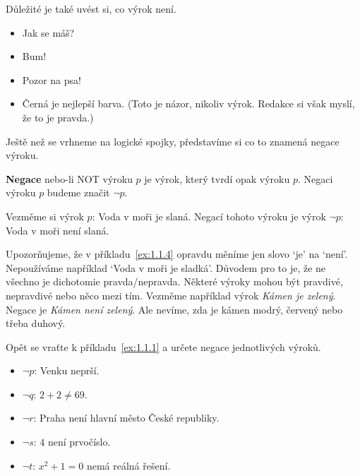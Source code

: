\pagebreak
\begin{example}
  Důležité je také uvést si, co výrok není. 
  \begin{itemize}
    \item Jak se máš?
    \item Bum!
    \item Pozor na psa!
    \item Černá je nejlepší barva. (Toto je názor, nikoliv výrok. Redakce si však myslí, že to je pravda.)
  \end{itemize}
\end{example}

Ještě než se vrhneme na logické spojky, představíme si co to znamená negace výroku.

\begin{definitionbox}
  \textbf{Negace} nebo-li NOT výroku $p$ je výrok, který tvrdí opak výroku $p$. Negaci výroku $p$ budeme značit $\neg p$.
\end{definitionbox}

\begin{example}
  Vezměme si výrok $p$: Voda v moři je slaná. Negací tohoto výroku je výrok $\neg p$: Voda v moři není slaná. 
\end{example}

\begin{definitionbox}
  Upozorňujeme, že v příkladu~\ref{ex:1.1.4} opravdu měníme jen slovo `je' na `není'. Nepoužíváme například `Voda v moři je sladká'. Důvodem pro to je, že ne všechno je dichotomie pravda/nepravda. Některé výroky mohou být pravdivé, nepravdivé nebo něco mezi tím. Vezměme například výrok \textit{Kámen je zelený}. Negace je \textit{Kámen není zelený}. Ale nevíme, zda je kámen modrý, červený nebo třeba duhový.
\end{definitionbox}

\begin{problem}
  Opět se vraťte k příkladu~\ref{ex:1.1.1} a určete negace jednotlivých výroků.
\end{problem}

\begin{solution}
  \begin{itemize}
    \item $\neg p$: Venku neprší.
    \item $\neg q$: $2 + 2 \neq 69$.
    \item $\neg r$: Praha není hlavní město České republiky.
    \item $\neg s$: $4$ není prvočíslo.
    \item $\neg t$: $x^2 + 1 = 0$ nemá reálná řešení.
  \end{itemize}
\end{solution}

